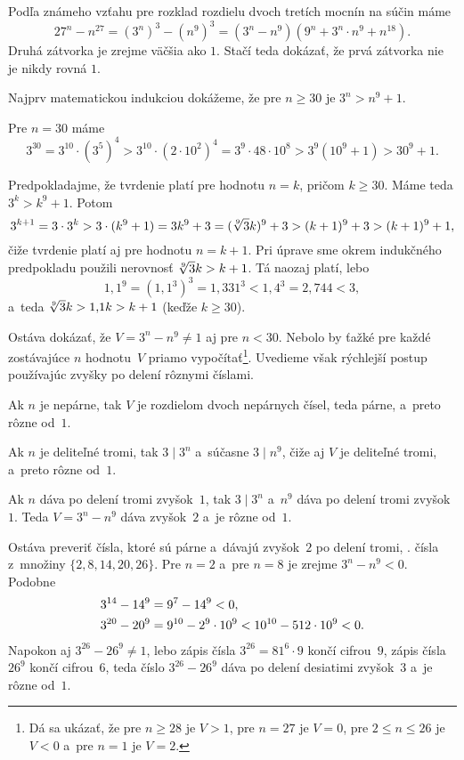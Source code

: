 {%
Podľa známeho vzťahu pre rozklad rozdielu dvoch tretích mocnín na súčin máme
$$
27^n-n^{27} = (3^n)^3-(n^9)^3=(3^n-n^9)(9^n+3^n\cdot n^9+n^{18}).
$$
Druhá zátvorka je zrejme väčšia ako $1$. Stačí teda dokázať, že prvá zátvorka nie je nikdy rovná $1$.

Najprv matematickou indukciou dokážeme, že pre $n\ge 30$ je $3^n>n^9+1$.

Pre $n=30$ máme
$$
3^{30}=3^{10}\cdot (3^5)^4>3^{10}\cdot (2\cdot 10^2)^4=3^9\cdot48\cdot 10^8>3^9(10^9+1)>30^9+1.
$$

Predpokladajme, že tvrdenie platí pre hodnotu $n=k$, pričom $k\ge30$. Máme teda $3^k>k^9+1$. Potom
$$
3^{k+1}=3\cdot3^k>3\cdot(k^9+1)=3k^9+3=(\root9\of3k)^9+3>(k+1)^9+3>(k+1)^9+1,
$$
čiže tvrdenie platí aj pre hodnotu $n=k+1$. Pri úprave sme okrem indukčného predpokladu použili nerovnosť $\root9\of3k>k+1$. Tá naozaj platí, lebo
$$
1{,}1^9=(1{,}1^3)^3=1{,}331^3<1{,}4^3=2{,}744<3,
$$
a~teda $\root9\of3k>1{,}1k>k+1$ (keďže $k\ge30$).

\smallskip
Ostáva dokázať, že $V=3^n-n^9\ne 1$ aj pre $n<30$. Nebolo by ťažké pre každé zostávajúce $n$ hodnotu~$V$ priamo vypočítať\footnote{Dá sa ukázať, že pre $n\ge28$ je $V>1$, pre $n=27$ je $V=0$, pre $2\le n\le26$ je $V<0$ a~pre $n=1$ je $V=2$.}. Uvedieme však rýchlejší postup používajúc zvyšky po delení rôznymi číslami.

Ak $n$ je nepárne, tak $V$ je rozdielom dvoch nepárnych čísel, teda párne, a~preto rôzne od~$1$.

Ak $n$ je deliteľné tromi, tak $3\mid 3^n$ a~súčasne $3\mid n^9$, čiže aj $V$ je deliteľné tromi, a~preto rôzne od~$1$.

Ak $n$ dáva po delení tromi zvyšok~$1$, tak $3\mid 3^n$ a~$n^9$ dáva po delení tromi zvyšok~$1$. Teda $V=3^n-n^9$ dáva zvyšok~$2$ a~je rôzne od~$1$.

Ostáva preveriť čísla, ktoré sú párne a~dávajú zvyšok~$2$ po delení tromi, \tj. čísla z~množiny $\{2,8,14,20,26\}$. Pre $n=2$ a~pre $n=8$ je zrejme $3^n-n^9<0$. Podobne
$$
\aligned
  3^{14}-14^9&=9^7-14^9<0,\\
  3^{20}-20^9&=9^{10}-2^9\cdot10^9<10^{10}-512\cdot 10^9<0.
\endaligned
$$
Napokon aj $3^{26}-26^9\ne1$, lebo zápis čísla $3^{26}=81^6\cdot9$ končí cifrou~$9$, zápis čísla $26^9$ končí cifrou~$6$, teda číslo $3^{26}-26^9$ dáva po delení desiatimi zvyšok~$3$ a~je rôzne od~$1$.}

